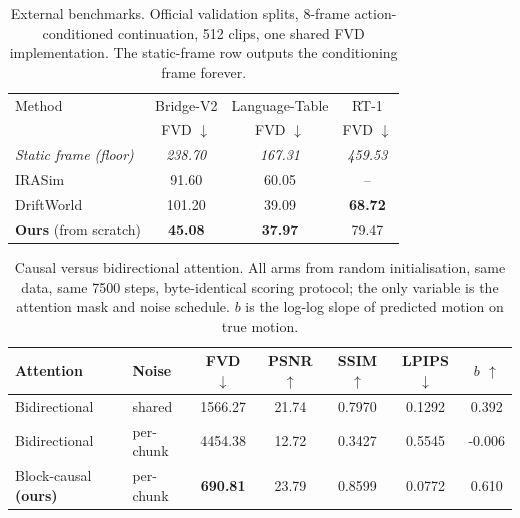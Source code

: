 \begin{table}[t]\centering
\caption{External benchmarks. Official validation splits, 8-frame action-conditioned continuation, 512 clips, one shared FVD implementation. The static-frame row outputs the conditioning frame forever.}
\begin{tabular}{lccc}
\toprule
Method & Bridge-V2 & Language-Table & RT-1 \\
 & FVD $\downarrow$ & FVD $\downarrow$ & FVD $\downarrow$ \\
\midrule
\textit{Static frame (floor)} & \textit{238.70} & \textit{167.31} & \textit{459.53} \\
IRASim & 91.60 & 60.05 & -- \\
DriftWorld & 101.20 & 39.09 & \textbf{68.72} \\
\midrule
\textbf{Ours} (from scratch) & \textbf{45.08} & \textbf{37.97} & 79.47 \\
\bottomrule
\end{tabular}
\end{table}

\begin{table}[t]\centering
\caption{Causal versus bidirectional attention. All arms from random initialisation, same data, same 7500 steps, byte-identical scoring protocol; the only variable is the attention mask and noise schedule. $b$ is the log-log slope of predicted motion on true motion.}
\begin{tabular}{llccccc}
\toprule
Attention & Noise & FVD $\downarrow$ & PSNR $\uparrow$ & SSIM $\uparrow$ & LPIPS $\downarrow$ & $b$ $\uparrow$ \\
\midrule
Bidirectional & shared & 1566.27 & 21.74 & 0.7970 & 0.1292 & 0.392 \\
Bidirectional & per-chunk & 4454.38 & 12.72 & 0.3427 & 0.5545 & -0.006 \\
Block-causal \textbf{(ours)} & per-chunk & \textbf{690.81} & 23.79 & 0.8599 & 0.0772 & 0.610 \\
\bottomrule
\end{tabular}
\end{table}
